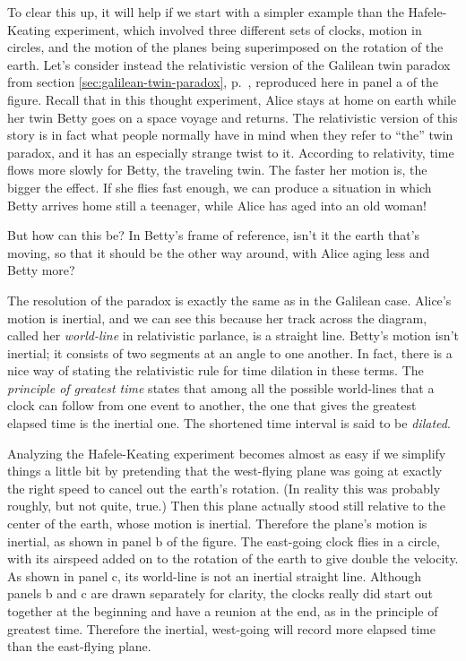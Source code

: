 


To clear this up, it will help if we start with
a simpler example than the Hafele-Keating experiment, which involved three different sets of clocks, motion
in circles, and the motion of the planes being superimposed on the rotation of the earth.
Let's consider instead the relativistic version of the Galilean twin paradox from section
\ref{sec:galilean-twin-paradox}, p.~\pageref{sec:galilean-twin-paradox}, reproduced here in
panel a of the figure. Recall that in this thought
experiment, Alice stays at home on earth while her twin Betty goes on a space voyage and returns. The relativistic version
of this story
is in fact what people normally have in mind when they refer to ``the'' twin paradox, and it has an especially
strange twist to it. According to relativity, time flows more slowly for Betty, the traveling twin.
The faster her motion is, the bigger the effect. If she flies fast enough, we can produce a situation
in which Betty arrives home still a teenager, while Alice has aged into an old woman!

But how can this be? In Betty's frame of reference, isn't it the earth that's moving, so that it should
be the other way around, with Alice aging less and Betty more?

The resolution of the paradox is exactly the same as
in the Galilean case. Alice's motion is inertial, and we can see this because her track across the diagram, called
her \emph{world-line} in relativistic parlance, is a straight line. Betty's motion isn't inertial; it consists of
two segments at an angle to one another. In fact, there is a nice way of stating the relativistic rule for time dilation
in these terms. The \emph{principle of greatest time} states that among all the possible world-lines that a clock
can follow from one event to another, the one that gives the greatest elapsed time is the inertial one.
The shortened time interval is said to be \emph{dilated}.

Analyzing the Hafele-Keating experiment becomes almost as easy if we simplify things a little bit by pretending
that the west-flying plane was going at exactly the right speed to cancel out the earth's rotation. (In reality this
was probably roughly, but not quite, true.) Then this plane actually stood still relative to the center of the earth,
whose motion is inertial. Therefore the plane's motion is inertial, as shown in panel b of the figure. The east-going
clock flies in a circle, with its airspeed added on to the rotation of the earth to give double the velocity.
As shown in panel c, its world-line is not an inertial straight line. Although panels b and c are drawn separately
for clarity, the clocks really did start out together at the beginning and have a reunion at the end, as in
the principle of greatest time. Therefore the inertial, west-going will record more elapsed time
than the east-flying plane.


